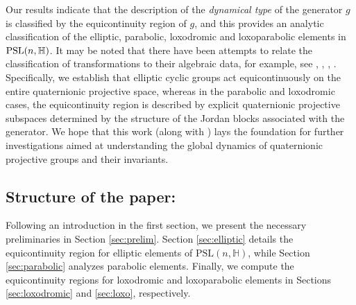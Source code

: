 \documentclass[12pt,reqno]{amsart}
\numberwithin{equation}{section}
\theoremstyle{definition}
\def\H{\mathbb H}
\def\H{\mathbb {H}}
\begin{document}
Our results indicate that the description of the \emph{dynamical type} of the generator $g$ is classified by the equicontinuity region of $g$, and this provides an analytic classification of the elliptic, parabolic, loxodromic and loxoparabolic elements in ${\rm PSL}(n, \H)$.  It may be noted that there have been attempts to relate the classification of transformations to their algebraic data, for example, see \cite{dgl2}, \cite{kl}, \cite{ps}, \cite{go}. Specifically, we establish that elliptic cyclic groups act equicontinuously on the entire quaternionic projective space, whereas in the parabolic and loxodromic cases, the equicontinuity region is described by explicit quaternionic projective subspaces determined by the structure of the Jordan blocks associated with the generator. We hope that this work (along with \cite{dgm}) lays the foundation for further investigations aimed at understanding the global dynamics of quaternionic projective groups and their invariants.

		\subsection{Structure of the paper:} Following an introduction in the first section, we present the necessary preliminaries in Section \ref{sec:prelim}. Section \ref{sec:elliptic} details the equicontinuity region for elliptic elements of 
    $\mathrm{PSL}(n,\H)$, while Section \ref{sec:parabolic} analyzes parabolic elements. Finally, we compute the equicontinuity regions for loxodromic and loxoparabolic elements in Sections \ref{sec:loxodromic} and \ref{sec:loxo}, respectively.
\end{document}
